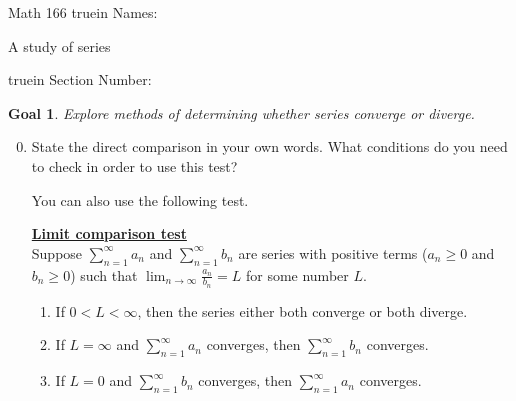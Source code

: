 \documentclass[12pt]{article}
\newtheorem*{goal}{Goal}
\begin{document}
\pagestyle{empty} %

\noindent
{Math 166  truein  Names:\ \hrulefill}

\noindent
{A study of series}

\noindent {} truein  Section Number:\ \hrulefill
\medskip

\begin{goal} \rm
Explore methods of determining whether series converge or diverge. 
\end{goal}

\begin{enumerate}
\setcounter{enumi}{-1}

\item State the direct comparison  in your own words. What conditions do you need to check in order to use this test?




\vfill
You can also use the following test.

\bigskip
\noindent
\underline{\textbf{Limit comparison test}}\\

Suppose $\displaystyle\sum_{n=1}^\infty a_n$   and $\displaystyle\sum_{n=1}^\infty b_n$ are series with positive terms ($a_n\geq 0$ and $b_n\geq 0$) such that $\displaystyle\lim_{n\to \infty}\frac{a_n}{b_n} =L$  for some number $L$. 
\begin{enumerate}
    \item If $0<L<\infty$, then the series either both converge or  both diverge. 
    \item If $L = \infty$ and $\displaystyle\sum_{n=1}^\infty a_n$  converges, then $\displaystyle\sum_{n=1}^\infty b_n$ converges.
    \item If $L = 0$ and $\displaystyle\sum_{n=1}^\infty b_n$ converges, then $\displaystyle\sum_{n=1}^\infty a_n$ converges. 
\end{enumerate}


\end{enumerate}
\end{document}
